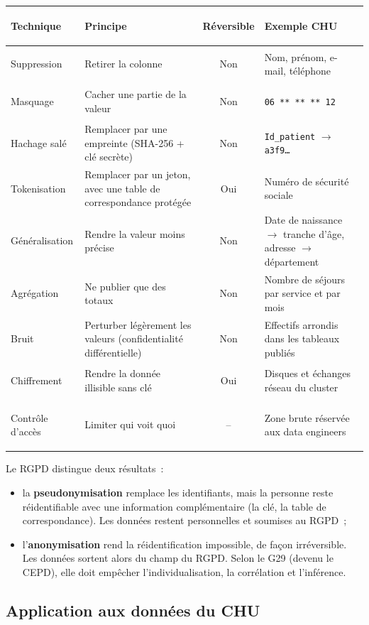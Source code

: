 \begin{center}
\small
\begin{tabularx}{\textwidth}{>{\bfseries\raggedright\arraybackslash}p{2.5cm} >{\raggedright\arraybackslash}X c >{\raggedright\arraybackslash}X}
\toprule
Technique & Principe & Réversible & Exemple CHU \\
\midrule
Suppression & Retirer la colonne & Non & Nom, prénom, e-mail, téléphone \\
Masquage & Cacher une partie de la valeur & Non & \texttt{06 ** ** ** 12} \\
Hachage salé & Remplacer par une empreinte (SHA-256 + clé secrète) & Non & \texttt{Id\_patient} $\rightarrow$ \texttt{a3f9\dots} \\
Tokenisation & Remplacer par un jeton, avec une table de correspondance protégée & Oui & Numéro de sécurité sociale \\
Généralisation & Rendre la valeur moins précise & Non & Date de naissance $\rightarrow$ tranche d'âge, adresse $\rightarrow$ département \\
Agrégation & Ne publier que des totaux & Non & Nombre de séjours par service et par mois \\
Bruit & Perturber légèrement les valeurs (confidentialité différentielle) & Non & Effectifs arrondis dans les tableaux publiés \\
Chiffrement & Rendre la donnée illisible sans clé & Oui & Disques et échanges réseau du cluster \\
Contrôle d'accès & Limiter qui voit quoi & -- & Zone brute réservée aux data engineers \\
\bottomrule
\end{tabularx}
\end{center}

\noindent Le RGPD distingue deux résultats~:
\begin{itemize}
	\item la \textbf{pseudonymisation} remplace les identifiants, mais la personne reste réidentifiable avec une information complémentaire (la clé, la table de correspondance). Les données restent personnelles et soumises au RGPD~;
	\item l'\textbf{anonymisation} rend la réidentification impossible, de façon irréversible. Les données sortent alors du champ du RGPD. Selon le G29 (devenu le CEPD), elle doit empêcher l'individualisation, la corrélation et l'inférence.
\end{itemize}

\subsection{Application aux données du CHU}

